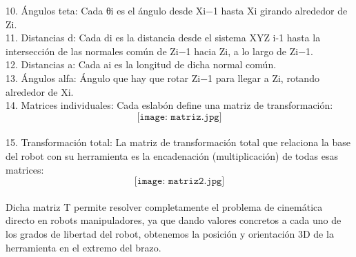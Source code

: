\documentclass[12pt,a4paper]{report}
\begin{document}
10. Ángulos teta: Cada θi es el ángulo desde Xi−1 hasta Xi girando alrededor de Zi.\\
11. Distancias d: Cada  di es la distancia desde el sistema XYZ i-1 hasta la intersección de las normales común de  Zi−1 hacia Zi, a lo largo de  Zi−1.\\
12. Distancias a: Cada  ai es la longitud de dicha normal común.\\
13. Ángulos alfa: Ángulo que hay que rotar Zi−1 para llegar a Zi, rotando alrededor de Xi.\\
14. Matrices individuales: Cada eslabón define una matriz de transformación:\\
$$\texttt{[image: matriz.jpg]}$$ \\

15. Transformación total: La matriz de transformación total que relaciona la base del robot con su herramienta es la encadenación (multiplicación) de todas esas matrices:\\
$$\texttt{[image: matriz2.jpg]} $$\\
Dicha matriz T permite resolver completamente el problema de cinemática directo en robots manipuladores, ya que dando valores concretos a cada uno de los grados de libertad del robot, obtenemos la posición y orientación 3D de la herramienta en el extremo del brazo.
\end{document}
